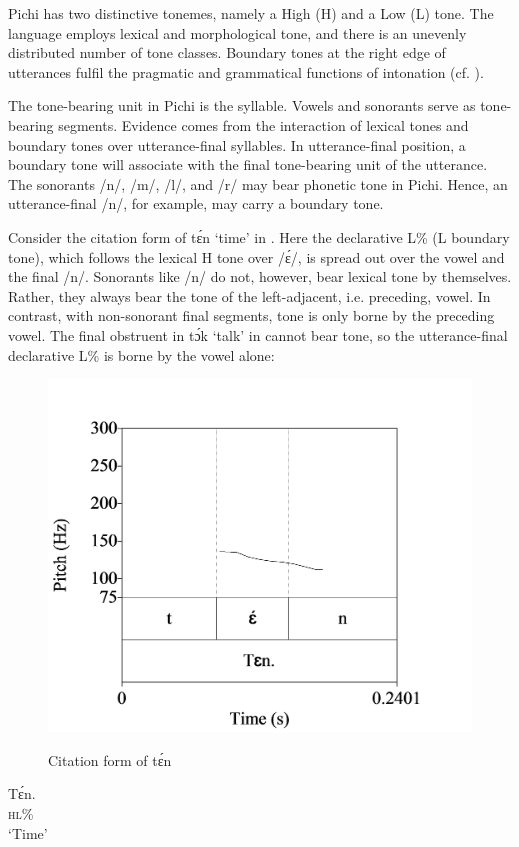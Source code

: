 Pichi has two distinctive tonemes, namely a High (H) and a Low (L) tone. The language employs lexical and morphological tone, and there is an unevenly distributed number of tone classes. Boundary tones at the right edge of utterances fulfil the pragmatic and grammatical functions of intonation (cf. ).


The tone-bearing unit in Pichi is the syllable. Vowels and sonorants serve as tone-bearing segments. Evidence comes from the interaction of lexical tones and boundary tones over utterance-final syllables. In utterance-final position, a boundary tone will associate with the final tone-bearing unit of the utterance. The sonorants /n/, /m/, /l/, and /r/ may bear phonetic tone in Pichi. Hence, an utterance-final /n/, for example, may carry a boundary tone. 



Consider the citation form of tɛ́n ‘time’ in . Here the declarative L\% (L boundary tone), which follows the lexical H tone over /ɛ́/, is spread out over the vowel and the final /n/. Sonorants like /n/ do not, however, bear lexical tone by themselves. Rather, they always bear the tone of the left-adjacent, i.e. preceding, vowel. In contrast, with non-sonorant final segments, tone is only borne by the preceding vowel. The final obstruent in tɔ́k ‘talk’ in  cannot bear tone, so the utterance-final declarative L\% is borne by the vowel alone:

	
\begin{figure}
	\caption{Citation form of tɛ́n}
	\includegraphics[width=.44\textwidth]{figures/yakpomod-img3.png}
	\label{fig:key:3.1}
\end{figure}
\ea\label{ex:key:43}
\gll Tɛ́n.\\
\textsc{hl\%}\\
\glt  ‘Time’
\z

